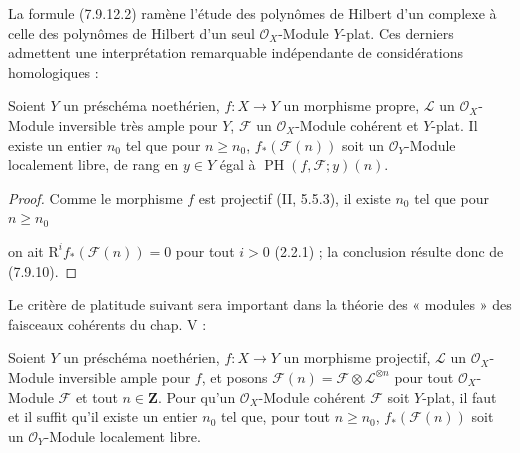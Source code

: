 La formule (7.9.12.2) ramène l'étude des polynômes de Hilbert d'un complexe à
celle des polynômes de Hilbert d'un seul $\mathscr O_X$-Module $Y$-plat. Ces
derniers admettent une interprétation remarquable indépendante de considérations
homologiques :

\begin{corollary}[7.9.13]
\label{III.7.9.13.fr}
Soient $Y$ un préschéma noethérien, $f:X\to Y$ un morphisme propre,
$\mathscr L$ un $\mathscr O_X$-Module inversible très ample pour $Y$,
$\mathscr F$ un $\mathscr O_X$-Module cohérent et $Y$-plat. Il existe un entier
$n_0$ tel que pour $n\geq n_0$, $f_*(\mathscr F(n))$ soit un
$\mathscr O_Y$-Module localement libre, de rang en $y\in Y$ égal à
$\operatorname{PH}(f,\mathscr F;y)(n)$.
\end{corollary}

\begin{proof}
Comme le morphisme $f$ est projectif (II, 5.5.3), il existe $n_0$ tel que pour
$n\geq n_0$

on ait $\mathrm R^if_*(\mathscr F(n))=0$ pour tout $i>0$ (2.2.1) ; la conclusion
résulte donc de (7.9.10).
\end{proof}

Le critère de platitude suivant sera important dans la théorie des « modules »
des faisceaux cohérents du chap. V :

\begin{proposition}[7.9.14]
\label{III.7.9.14.fr}
Soient $Y$ un préschéma noethérien, $f:X\to Y$ un morphisme projectif,
$\mathscr L$ un $\mathscr O_X$-Module inversible ample pour $f$, et posons
$\mathscr F(n)=\mathscr F\otimes\mathscr L^{\otimes n}$ pour tout
$\mathscr O_X$-Module $\mathscr F$ et tout $n\in\mathbf Z$. Pour qu'un
$\mathscr O_X$-Module cohérent $\mathscr F$ soit $Y$-plat, il faut et il suffit
qu'il existe un entier $n_0$ tel que, pour tout $n\geq n_0$,
$f_*(\mathscr F(n))$ soit un $\mathscr O_Y$-Module localement libre.
\end{proposition}

